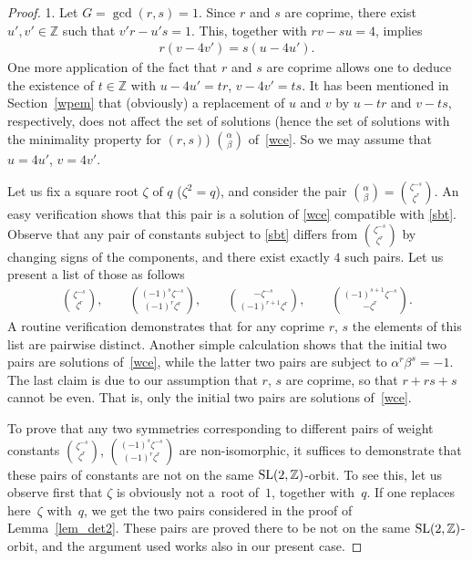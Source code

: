 \documentclass[10pt,a4paper]{amsart}
\numberwithin{equation}{section}
\begin{document}
\begin{proof} 1. Let $G=\operatorname{gcd}(r,s)=1$. Since $r$ and $s$ are coprime, there exist $u',v'\in\mathbb{Z}$ such that $v'r-u's=1$. This, together with $rv-su=4$, implies
\begin{gather*}r(v-4v')=s(u-4u').\end{gather*}
One more application of the fact that $r$ and $s$ are coprime allows one to deduce the existence of $t\in\mathbb{Z}$ with $u-4u'=tr$, $v-4v'=ts$. It has been mentioned in Section~\ref{wpem} that (obviously) a replacement of $u$ and $v$ by $u-tr$ and $v-ts$, respectively, does not affect the set of solutions (hence the set of solutions with the minimality property for $(r,s)$) $\binom{\alpha}{\beta}$ of~\eqref{wce}. So we may assume that $u=4u'$, $v=4v'$.

Let us fix a square root $\zeta$ of $q$ ($\zeta^2=q$), and consider the pair $\binom{\alpha}{\beta}=\binom{\zeta^{-s}}{\zeta^r}$. An easy verification shows that this pair is a solution of \eqref{wce} compatible with \eqref{sbt}. Observe that any pair of constants subject to \eqref{sbt} differs from $\binom{\zeta^{-s}}{\zeta^r}$ by changing signs of the components, and there exist exactly $4$ such pairs. Let us present a list of those as follows
\begin{gather*}
\binom{\zeta^{-s}}{\zeta^r},\qquad\binom{(-1)^s\zeta^{-s}}{(-1)^r\zeta^r}, \qquad\binom{-\zeta^{-s}}{(-1)^{r+1}\zeta^r},\qquad
\binom{(-1)^{s+1}\zeta^{-s}}{-\zeta^r}.
\end{gather*}
A routine verification demonstrates that for any coprime $r$, $s$ the elements of this list are pairwise distinct. Another simple calculation shows that the initial two pairs are solutions of~\eqref{wce}, while the latter two pairs are subject to $\alpha^r\beta^s=-1$. The last claim is due to our assumption that $r$, $s$ are coprime, so that $r+rs+s$ cannot be even. That is, only the initial two pairs are solutions of~\eqref{wce}.

To prove that any two symmetries corresponding to different pairs of weight constants $\binom{\zeta^{-s}}{\zeta^r}$, $\binom{(-1)^s\zeta^{-s}}{(-1)^r\zeta^r}$ are non-isomorphic, it suffices to demonstrate that these pairs of constants are not on the same ${\rm SL}(2,\mathbb{Z})$-orbit. To see this, let us observe first that $\zeta$ is obviously not a~root of~$1$, together with~$q$. If one replaces here~$\zeta$ with~$q$, we get the two pairs considered in the proof of Lemma~\ref{lem_det2}. These pairs are proved there to be not on the same ${\rm SL}(2,\mathbb{Z})$-orbit, and the argument used works also in our present case.


\end{proof}
\end{document}
